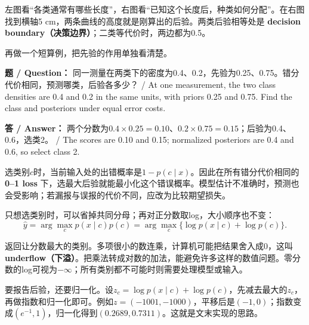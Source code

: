 

左图看“各类通常有哪些长度”，右图看“已知这个长度后，种类如何分配”。在右图找到横轴5 cm，两条曲线的高度就是刚算出的后验。两类后验相等处是 \textbf{decision boundary（决策边界）}；二类等代价时，两边都为0.5。





再做一个短算例，把先验的作用单独看清楚。


\textbf{题 / Question：} 同一测量在两类下的密度为0.4、0.2，先验为0.25、0.75。错分代价相同，预测哪类，后验各多少？ / At one measurement, the two class densities are 0.4 and 0.2 in the same units, with priors 0.25 and 0.75. Find the class and posteriors under equal error costs.


\textbf{答 / Answer：} 两个分数为\(0.4\times0.25=0.10\)、\(0.2\times0.75=0.15\)；后验为0.4、0.6，选类2。 / The scores are 0.10 and 0.15; normalized posteriors are 0.4 and 0.6, so select class 2.


选类别\(c\)时，当前输入处的出错概率是\(1-p(c\mid x)\)。因此在所有错分代价相同的 \textbf{0–1 loss} 下，选最大后验就能最小化这个错误概率。模型估计不准确时，预测也会受影响；若漏报与误报的代价不同，应改为比较期望损失。








只想选类别时，可以省掉共同分母；再对正分数取log，大小顺序也不变：
\[
\hat y=\arg\max_c p(x\mid c)p(c)
=\arg\max_c\{\log p(x\mid c)+\log p(c)\}.
\tag{2.14}
\]


返回让分数最大的类别。多项很小的数连乘，计算机可能把结果舍入成0，这叫 \textbf{underflow（下溢）}。把乘法转成对数的加法，能避免许多这样的数值问题。零分数的log可视为\(-\infty\)；所有类别都不可能时则需要处理模型或输入。


要报告后验，还要归一化。设\(z_c=\log p(x\mid c)+\log p(c)\)，先减去最大的\(z_c\)，再做指数和归一化即可。例如\(z=(-1001,-1000)\)，平移后是\((-1,0)\)；指数变成\((e^{-1},1)\)，归一化得到\((0.2689,0.7311)\)。这就是文末实现的思路。


